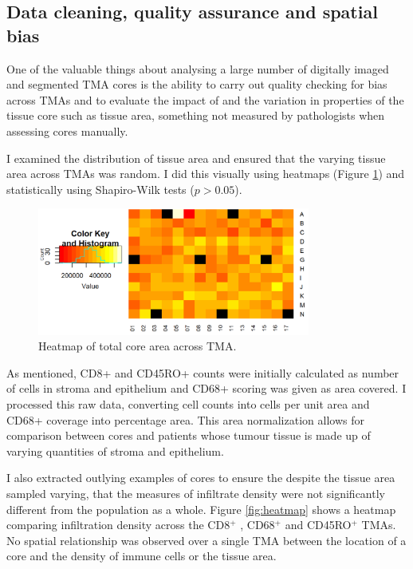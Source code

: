  \subsection{Data cleaning, quality assurance and spatial bias}

One of the valuable things about analysing a large number of digitally imaged and segmented TMA cores is the ability to carry out quality checking for bias across TMAs and to evaluate the impact of and the variation in properties of the tissue core such as tissue area, something not measured by pathologists when assessing cores manually.

I examined the distribution of tissue area and ensured that the varying tissue area across TMAs was random. I did this visually using heatmaps (Figure \ref{fig:heatmap_area}) and statistically using Shapiro-Wilk tests ($p > 0.05 $). 

\begin{figure}
    \centering
    \includegraphics[width=0.8\textwidth]{Chapter2/Figs/Raster/area_heatmap.png}
    \caption{Heatmap of total core area across TMA.}
    \label{fig:heatmap_area}
\end{figure}


 
As mentioned, CD8+ and CD45RO+ counts were initially calculated as number of cells in stroma and epithelium and CD68+ scoring was given as area covered. I processed this raw data, converting cell counts into cells per unit area and CD68+ coverage into percentage area. This area normalization allows for comparison between cores and patients whose tumour tissue is made up of varying quantities of stroma and epithelium. 

I also extracted outlying examples of cores to ensure the despite the tissue area sampled varying, that the measures of infiltrate density were not significantly different from the population as a whole. Figure \ref{fig:heatmap} shows a heatmap comparing infiltration density across the CD8$^+$ , CD68$^+$ and CD45RO$^+$ TMAs. No spatial relationship was observed over a single TMA between the location of a core and the density of immune cells or the tissue area. 



